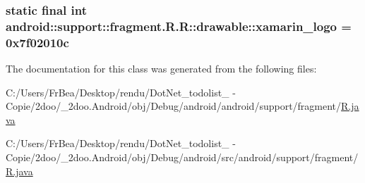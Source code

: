 \hypertarget{classandroid_1_1support_1_1fragment_1_1_r_1_1drawable_71ee49f291ef12fd91e38ba2d952718c}{
\subsubsection[{xamarin\_\-logo}]{\setlength{\rightskip}{0pt plus 5cm}static final int android::support::fragment.R.R::drawable::xamarin\_\-logo = 0x7f02010c}}
\label{classandroid_1_1support_1_1fragment_1_1_r_1_1drawable_71ee49f291ef12fd91e38ba2d952718c}




The documentation for this class was generated from the following files:\begin{CompactItemize}
\item 
C:/Users/FrBea/Desktop/rendu/DotNet\_\-todolist\_ - Copie/2doo/\_\-2doo.Android/obj/Debug/android/android/support/fragment/\hyperlink{android_2support_2fragment_2_r_8java}{R.java}\item 
C:/Users/FrBea/Desktop/rendu/DotNet\_\-todolist\_ - Copie/2doo/\_\-2doo.Android/obj/Debug/android/src/android/support/fragment/\hyperlink{src_2android_2support_2fragment_2_r_8java}{R.java}\end{CompactItemize}
